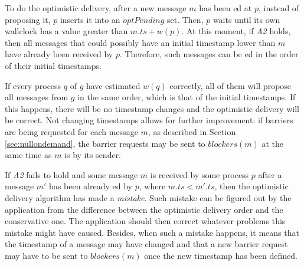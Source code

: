 \documentclass[times, 10pt]{article}
\begin{document}
To do the optimistic delivery, after a new message $m$ has been \rmdel{}ed at $p$, instead of proposing it, $p$ inserts it into an $optPending$ set. Then, $p$ waits until its own wallclock has a value greater than $m.ts + w(p)$. At this moment, if \emph{A2} holds, then all messages that could possibly have an initial timestamp lower than $m$ have already been received by $p$. Therefore, such messages can be \optdel{}ed in the order of their initial timestamps.

If every process $q$ of $g$ have estimated $w(q)$ correctly, all of them will propose all messages from $g$ in the same order, which is that of the initial timestamps. If this happens, there will be no timestamp changes and the optimistic delivery will be correct. Not changing timestamps allows for further improvement: if barriers are being requested for each message $m$, as described in Section \ref{sec:nullondemand}, the barrier requests may be sent to $blockers(m)$ at the same time as $m$ is \rmcast{} by its sender.

If \emph{A2} fails to hold and some message $m$ is received by some process $p$ after a message $m'$ has been already \optdel{}ed by $p$, where $m.ts < m'.ts$, then the optimistic delivery algorithm has made a \textit{mistake}. Such mistake can be figured out by the application from the difference between the optimistic delivery order and the conservative one. The application should then correct whatever problems this mistake might have caused. Besides, when such a mistake happens, it means that the timestamp of a message may have changed and that a new barrier request may have to be sent to $blockers(m)$ once the new timestamp has been defined.


\end{document}
